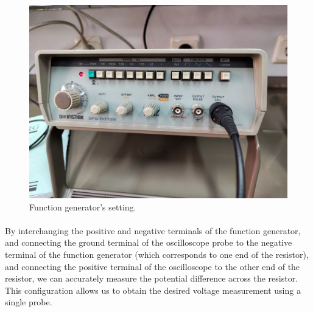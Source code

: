 \documentclass[11pt]{article}
\newcommand{\PicScale}{0.2}
\begin{document}
\begin{question}
{        \begin{figure}[H]
            \begin{center}
                \includegraphics[scale=\PicScale]{Fig/32.jpeg}
                \caption{Function generator's setting.}
            \end{center}
        \end{figure}

        \paragraph*{}
        By interchanging the positive and negative terminals
        of the function generator, and connecting the ground terminal
        of the oscilloscope probe to the negative terminal of the function
        generator (which corresponds to one end of the resistor),
        and connecting the positive terminal of the oscilloscope to the
        other end of the resistor, we can accurately measure the potential
        difference across the resistor. This configuration allows us to obtain
        the desired voltage measurement using a single probe.

}
\end{question}
\end{document}

